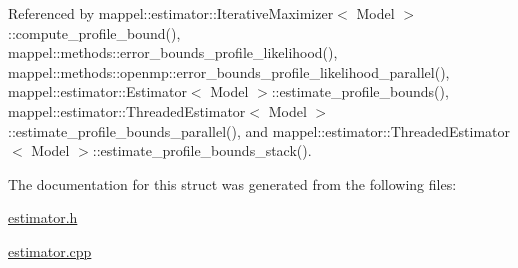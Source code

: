 Referenced by mappel\+::estimator\+::\+Iterative\+Maximizer$<$ Model $>$\+::compute\+\_\+profile\+\_\+bound(), mappel\+::methods\+::error\+\_\+bounds\+\_\+profile\+\_\+likelihood(), mappel\+::methods\+::openmp\+::error\+\_\+bounds\+\_\+profile\+\_\+likelihood\+\_\+parallel(), mappel\+::estimator\+::\+Estimator$<$ Model $>$\+::estimate\+\_\+profile\+\_\+bounds(), mappel\+::estimator\+::\+Threaded\+Estimator$<$ Model $>$\+::estimate\+\_\+profile\+\_\+bounds\+\_\+parallel(), and mappel\+::estimator\+::\+Threaded\+Estimator$<$ Model $>$\+::estimate\+\_\+profile\+\_\+bounds\+\_\+stack().



The documentation for this struct was generated from the following files\+:\begin{DoxyCompactItemize}
\item 
\hyperlink{estimator_8h}{estimator.\+h}\item 
\hyperlink{estimator_8cpp}{estimator.\+cpp}\end{DoxyCompactItemize}

